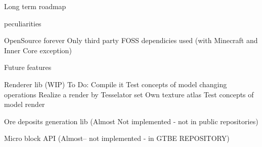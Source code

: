 \documentclass[12pt]{article}
\begin{document}
	Long term roadmap

	peculiarities

	OpenSource forever
	Only third party FOSS dependicies used (with Minecraft and Inner Core exception)

	Future features

	Renderer lib (WIP)
	To Do:
		Compile it
		Test concepts of model changing operations
		Realize a render by Tesselator
		set Own texture atlas
		Test concepts of model render

	Ore deposits generation lib (Almost Not implemented - not in public repositories)

	Micro block API (Almost-- not implemented - in GTBE REPOSITORY)
\end{document}
